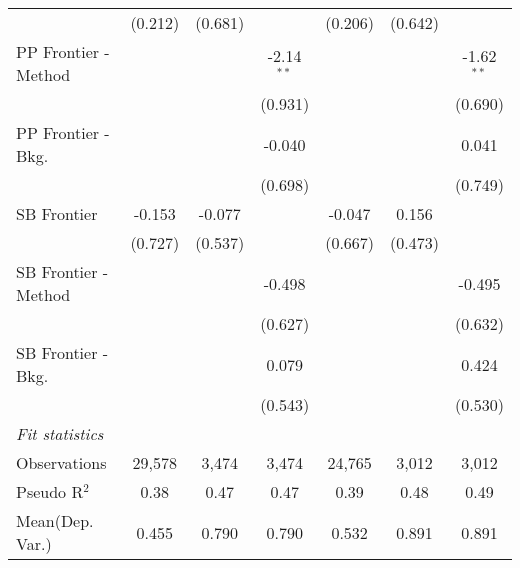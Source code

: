 \begin{tabular}{lcccccc}
                        & (0.212)       & (0.681) &              & (0.206)       & (0.642) &   \\   
   PP Frontier - Method &               &         & -2.14$^{**}$ &               &         & -1.62$^{**}$\\   
                        &               &         & (0.931)      &               &         & (0.690)\\   
   PP Frontier - Bkg.   &               &         & -0.040       &               &         & 0.041\\   
                        &               &         & (0.698)      &               &         & (0.749)\\   
   SB Frontier          & -0.153        & -0.077  &              & -0.047        & 0.156   &   \\   
                        & (0.727)       & (0.537) &              & (0.667)       & (0.473) &   \\   
   SB Frontier - Method &               &         & -0.498       &               &         & -0.495\\   
                        &               &         & (0.627)      &               &         & (0.632)\\   
   SB Frontier - Bkg.   &               &         & 0.079        &               &         & 0.424\\   
                        &               &         & (0.543)      &               &         & (0.530)\\   
   \midrule
   \emph{Fit statistics}\\
   Observations         & 29,578        & 3,474   & 3,474        & 24,765        & 3,012   & 3,012\\  
   Pseudo R$^2$         & 0.38          & 0.47    & 0.47         & 0.39          & 0.48    & 0.49\\  
Mean(Dep. Var.) & 0.455 & 0.790 & 0.790 & 0.532 & 0.891 & 0.891 \\
   

\end{tabular}

